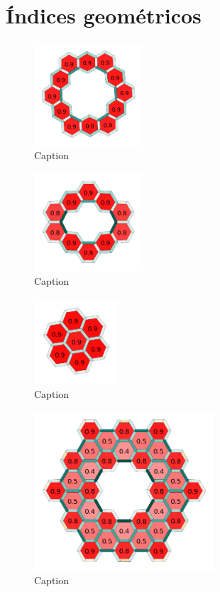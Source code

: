 \section{Índices geométricos}

\begin{figure}[htb!]
    \centering
    \includegraphics[width=0.36\textwidth]{images/kekulene.png}
    \caption{Caption}
    \label{fig:my_label}
\end{figure}

\begin{figure}[htb!]
    \centering
    \includegraphics[width=0.36\textwidth]{images/Icosaene.png}
    \caption{Caption}
    \label{fig:my_label}
\end{figure}

\begin{figure}[htb!]
    \centering
    \includegraphics[width=0.28\textwidth]{images/coronene.png}
    \caption{Caption}
    \label{fig:my_label}
\end{figure}

\begin{figure}[htb!]
    \centering
    \includegraphics[width=0.6\textwidth]{images/output.png}
    \caption{Caption}
    \label{fig:my_label}
\end{figure}